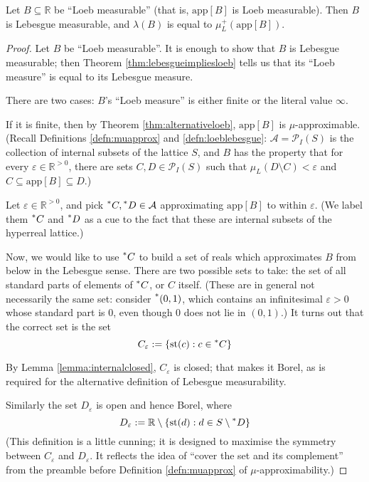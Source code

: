 \documentclass[11pt]{amsart}
\theoremstyle{remark}
\newcommand{\st}{\mathrm{st}}
\newcommand{\app}[1]{\mathrm{app}\left[#1\right]}
\newcommand{\hyp}[1][\mathbb{R}]{\prescript{*}{}{#1}}
\newcommand{\powerset}{\mathcal{P}}
\begin{document}
\begin{thm} \label{thm:loebimplieslebesgue}
Let $B \subseteq \mathbb{R}$ be ``Loeb measurable'' (that is, $\app{B}$ is Loeb measurable).
Then $B$ is Lebesgue measurable, and $\lambda(B)$ is equal to $\mu_L^+(\app{B})$.
\end{thm}
\begin{proof}
Let $B$ be ``Loeb measurable''.
It is enough to show that $B$ is Lebesgue measurable; then Theorem \ref{thm:lebesgueimpliesloeb} tells us that its ``Loeb measure'' is equal to its Lebesgue measure.

There are two cases: $B$'s ``Loeb measure'' is either finite or the literal value $\infty$.

If it is finite, then by Theorem \ref{thm:alternativeloeb}, $\app{B}$ is $\mu$-approximable.
(Recall Definitions \ref{defn:muapprox} and \ref{defn:loeblebesgue}: $\mathcal{A} = \powerset_I(S)$ is the collection of internal subsets of the lattice $S$, and $B$ has the property that for every $\varepsilon \in \mathbb{R}^{>0}$, there are sets $C, D \in \powerset_I(S)$ such that $\mu_L(D \setminus C) < \varepsilon$ and $C \subseteq \app{B} \subseteq D$.)

Let $\varepsilon \in \mathbb{R}^{> 0}$, and pick $\hyp[C], \hyp[D] \in \mathcal{A}$ approximating $\app{B}$ to within $\varepsilon$.
(We label them $\hyp[C]$ and $\hyp[D]$ as a cue to the fact that these are internal subsets of the hyperreal lattice.)

Now, we would like to use $\hyp[C]$ to build a set of reals which approximates $B$ from below in the Lebesgue sense.
There are two possible sets to take: the set of all standard parts of elements of $\hyp[C]$, or $C$ itself.
(These are in general not necessarily the same set: consider $\hyp[(]0, 1)$, which contains an infinitesimal $\varepsilon > 0$ whose standard part is $0$, even though $0$ does not lie in $(0, 1)$.)
It turns out that the correct set is the set $$C_{\varepsilon} := \{ \st(c): c \in \hyp[C] \}$$

By Lemma \ref{lemma:internalclosed}, $C_{\varepsilon}$ is closed; that makes it Borel, as is required for the alternative definition of Lebesgue measurability.

Similarly the set $D_{\varepsilon}$ is open and hence Borel, where $$D_{\varepsilon} := \mathbb{R} \setminus \{ \st(d): d \in S \setminus \hyp[D] \}$$
(This definition is a little cunning; it is designed to maximise the symmetry between $C_{\varepsilon}$ and $D_{\varepsilon}$.
It reflects the idea of ``cover the set and its complement'' from the preamble before Definition \ref{defn:muapprox} of $\mu$-approximability.)


\end{proof}
\end{document}
